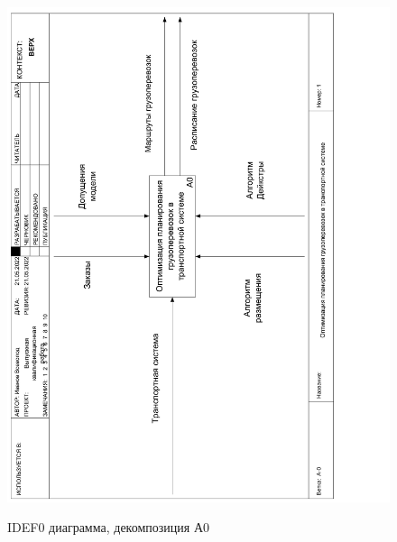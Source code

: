 \begin{figure}[h]
	\begin{center}
		{\includegraphics[scale=0.5, angle=-90, page=2]{img/idef0.pdf}}
		\caption{IDEF0 диаграмма, декомпозиция А0}
		\label{idef0:A0}
	\end{center}
\end{figure}

